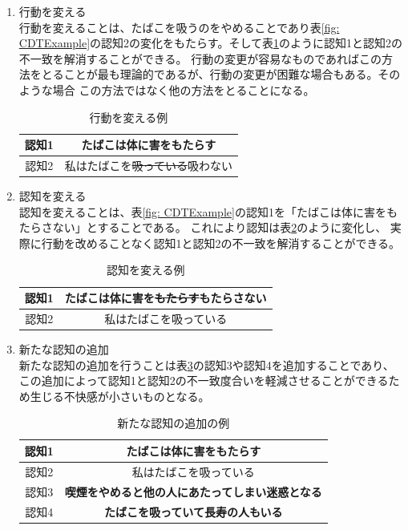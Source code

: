 \documentclass{kuisthesis}
\begin{document}
\begin{enumerate}
  \item 行動を変える \\
  行動を変えることは、たばこを吸うのをやめることであり表\ref{fig: CDTExample}の認知2の変化をもたらす。そして表\ref{fig: ReduceDissonanceAction}のように認知1と認知2の不一致を解消することができる。
行動の変更が容易なものであればこの方法をとることが最も理論的であるが、行動の変更が困難な場合もある。そのような場合
この方法ではなく他の方法をとることになる。
  \begin{table}[H]
    \centering
    \caption{行動を変える例}
    \label{fig: ReduceDissonanceAction}
    \begin{tabular}{c|c}

        認知1 & たばこは体に害をもたらす  \\ \hline
        認知2 & 私はたばこを\sout{吸っている}吸わない \\
    \end{tabular}
\end{table}
 \item 認知を変える \\
  認知を変えることは、表\ref{fig: CDTExample}の認知1を「たばこは体に害をもたらさない」とすることである。
  これにより認知は表\ref{fig: ReduceDissonanceChange}のように変化し、
  実際に行動を改めることなく認知1と認知2の不一致を解消することができる。
  \begin{table}[H]
    \centering
    \caption{認知を変える例}
    \label{fig: ReduceDissonanceChange}
    \begin{tabular}{c|c}
        認知1 & たばこは体に害を\sout{もたらす}もたらさない  \\ \hline
        認知2 & 私はたばこを吸っている \\
    \end{tabular}
    
  \end{table}

  \item 新たな認知の追加 \\
  新たな認知の追加を行うことは表\ref{fig: CDTExample2}の認知3や認知4を追加することであり、
この追加によって認知1と認知2の不一致度合いを軽減させることができるため生じる不快感が小さいものとなる。
\begin{table}[H]
  \centering
  \caption{新たな認知の追加の例}
  \label{fig: CDTExample2}
  \begin{tabular}{c|c}

      認知1 & たばこは体に害をもたらす  \\ \hline
      認知2 & 私はたばこを吸っている \\ \hline
      認知3 & \textbf{喫煙をやめると他の人にあたってしまい迷惑となる} \\ \hline
      認知4 & \textbf{たばこを吸っていて長寿の人もいる} \\ 
  \end{tabular}


\end{table}
\end{enumerate}
\end{document}
